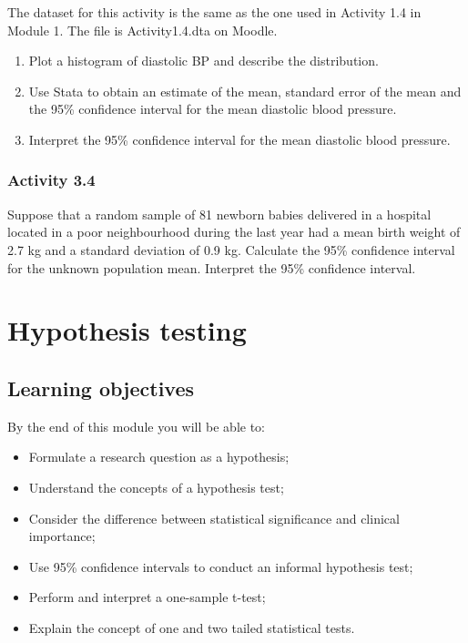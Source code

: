 \documentclass[
]{memoir}
\providecommand{\tightlist}{%
  \setlength{\itemsep}{0pt}\setlength{\parskip}{0pt}}
\begin{document}
The dataset for this activity is the same as the one used in Activity 1.4 in Module 1. The file is Activity1.4.dta on Moodle.

\begin{enumerate}
\def\labelenumi{\alph{enumi})}
\tightlist
\item
  Plot a histogram of diastolic BP and describe the distribution.
\item
  Use Stata to obtain an estimate of the mean, standard error of the mean and the 95\% confidence interval for the mean diastolic blood pressure.
\item
  Interpret the 95\% confidence interval for the mean diastolic blood pressure.
\end{enumerate}

\hypertarget{activity-3.4}{%
\subsection*{Activity 3.4}\label{activity-3.4}}

Suppose that a random sample of 81 newborn babies delivered in a hospital located in a poor neighbourhood during the last year had a mean birth weight of 2.7 kg and a standard deviation of 0.9 kg. Calculate the 95\% confidence interval for the unknown population mean. Interpret the 95\% confidence interval.

\hypertarget{hypothesis-testing}{%
\chapter{Hypothesis testing}\label{hypothesis-testing}}

\hypertarget{learning-objectives-3}{%
\section*{Learning objectives}\label{learning-objectives-3}}

By the end of this module you will be able to:

\begin{itemize}
\tightlist
\item
  Formulate a research question as a hypothesis;
\item
  Understand the concepts of a hypothesis test;
\item
  Consider the difference between statistical significance and clinical importance;
\item
  Use 95\% confidence intervals to conduct an informal hypothesis test;
\item
  Perform and interpret a one-sample t-test;
\item
  Explain the concept of one and two tailed statistical tests.
\end{itemize}
\end{document}
